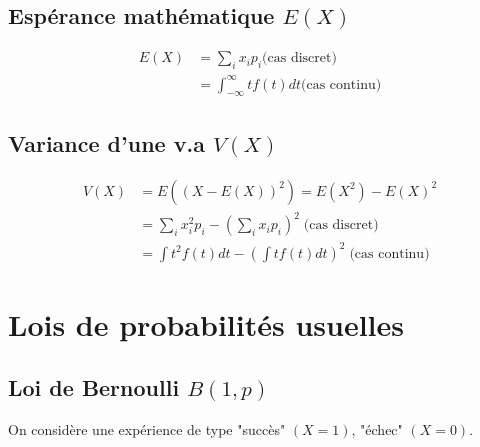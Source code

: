 \documentclass[11pt]{article}
\begin{document}
\subsection{Espérance mathématique \(E(X)\)}

\begin{equation}
\begin{split}
E(X)  & = \sum_{i} x_i p_i \text{(cas discret)} \\
& = \int_{-\infty}^{\infty} t f(t) dt \text{(cas continu)}
\end{split}
\end{equation}

\subsection{Variance d'une v.a \(V(X)\)}

\begin{equation}
\begin{split}
V(X) & = E((X - E(X))^2) = E(X^2) - E(X)^2 \\
& = \sum_{i} x_i^2 p_i - (\sum_{i} x_i p_i)^2 \; \text{(cas discret)} \\
& = \int t^2 f(t) dt - (\int t f(t) dt)^2 \; \text{(cas continu)}
\end{split}
\end{equation}

\section{Lois de probabilités usuelles}

\subsection{Loi de Bernoulli \(B(1, p)\)}

On considère une expérience de type "succès" \((X = 1)\), "échec" \((X = 0)\).
\
\end{document}
